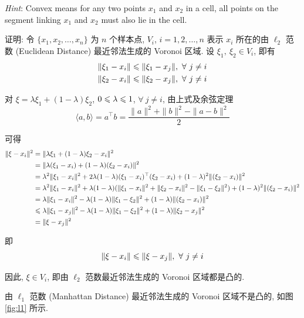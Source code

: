 \documentclass{article}
\begin{document}
\emph{Hint}: Convex means for any two points $x_1$ and $x_2$ in a cell, all points on the segment linking $x_1$ and $x_2$ must also lie in the cell.

证明: 令 $\{x_1,x_2,\dots,x_n\}$ 为 $n$ 个样本点, $V_i$, $i=1,2,\dots,n$ 表示 $x_i$ 所在的由 $\ell_2$ 范数 (Euclidean Distance) 最近邻法生成的 Voronoi 区域. 设 $\xi_1,~\xi_2\in V_i$, 即有
\begin{equation}
  \begin{aligned}
    \|\xi_1-x_i\|&\leqslant\|\xi_1-x_j\|,~\forall~j\neq i\\
    \|\xi_2-x_i\|&\leqslant\|\xi_2-x_j\|,~\forall~j\neq i\\
  \end{aligned}
\end{equation}

对 $\xi=\lambda\xi_1+(1-\lambda)\xi_2$, $0\leqslant\lambda\leqslant1$, $\forall~j\neq i$, 由上式及余弦定理
\begin{equation}
  \langle a,b\rangle = a^\top b = \frac{\|a\|^2+\|b\|^2-\|a-b\|^2}{2}
\end{equation}

可得
\begin{equation}
  \begin{aligned}
    \|\xi-x_i\|^2
    &=\|\lambda\xi_1+(1-\lambda)\xi_2-x_i\|^2\\
    &=\|\lambda(\xi_1-x_i)+(1-\lambda)(\xi_2-x_i)\|^2\\
    &=\lambda^2\|\xi_1-x_i\|^2+2\lambda(1-\lambda)(\xi_1-x_i)^\top(\xi_2-x_i)+(1-\lambda)^2\|(\xi_2-x_i)\|^2\\
    &=\lambda^2\|\xi_1-x_i\|^2+\lambda(1-\lambda)(\|\xi_1-x_i\|^2+\|\xi_2-x_i\|^2-\|\xi_1-\xi_2\|^2)+(1-\lambda)^2\|(\xi_2-x_i)\|^2\\
    &=\lambda\|\xi_1-x_i\|^2-\lambda(1-\lambda)\|\xi_1-\xi_2\|^2+(1-\lambda)\|(\xi_2-x_i)\|^2\\
    &\leqslant\lambda\|\xi_1-x_j\|^2-\lambda(1-\lambda)\|\xi_1-\xi_2\|^2+(1-\lambda)\|\xi_2-x_j\|^2\\
    &=\|\xi-x_j\|^2
  \end{aligned}
\end{equation}

即
\begin{equation}
  \|\xi-x_i\|\leqslant\|\xi-x_j\|,~\forall~j\neq i
\end{equation}

因此, $\xi\in V_i$, 即由 $\ell_2$ 范数最近邻法生成的 Voronoi 区域都是凸的. 

由 $\ell_1$ 范数 (Manhattan Distance) 最近邻法生成的 Voronoi 区域不是凸的, 如图 \ref{fig:l1} 所示.
\end{document}

